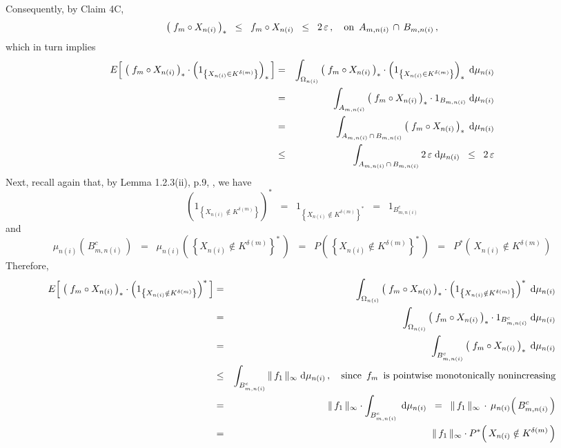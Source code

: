 Consequently, by Claim 4C,
\begin{equation*}
\left(\;f_{m} \circ X_{n(i)}\,\right)_{*}
\;\; \leq \;\;
	f_{m} \circ X_{n(i)}
\;\; \leq \;\;
	2\,\varepsilon\,,
\quad
\textnormal{on \,$A_{m,n(i)} \,\cap\, B_{m,n(i)}$}\,,
\end{equation*}
which in turn implies
\begin{eqnarray*}
E\!\left[\;
	\left(\;f_{m} \circ X_{n(i)}\,\right)_{*}
	\cdot
	\left(1_{\left\{X_{n(i)} \in K^{\delta(m)}\right\}}\right)_{*}
\,\right]
&=&
	\int_{\Omega_{n(i)}}
		\left(\;f_{m} \circ X_{n(i)}\,\right)_{*}
		\cdot
		\left(1_{\left\{X_{n(i)} \in K^{\delta(m)}\right\}}\right)_{*}
	\;\textnormal{d}\mu_{n(i)}
\\
&=&
	\int_{A_{m,n(i)}}
		\left(\;f_{m} \circ X_{n(i)}\,\right)_{*}
		\cdot
		1_{B_{m,n(i)}}
	\;\textnormal{d}\mu_{n(i)}
\\
&=&
	\int_{A_{m,n(i)} \,\cap\, B_{m,n(i)}}
		\left(\;f_{m} \circ X_{n(i)}\,\right)_{*}
	\;\textnormal{d}\mu_{n(i)}
\\
&\leq&
	\int_{A_{m,n(i)} \,\cap\, B_{m,n(i)}} 2\,\varepsilon \;\textnormal{d}\mu_{n(i)}
\;\; \leq \;\;
	2\,\varepsilon
\end{eqnarray*}
Next, recall again that, by Lemma 1.2.3(ii), p.9, \cite{vanDerVaart1996}, we have
\begin{equation*}
\left(1_{\left\{X_{n(i)} \notin K^{\delta(m)}\right\}}\right)^{*}
\;\; = \;\;
	1_{\left\{X_{n(i)} \notin K^{\delta(m)}\right\}^{*}}
\;\; = \;\;
	1_{B_{m,n(i)}^{c}}
\end{equation*}
and
\begin{equation*}
\mu_{n(i)}\!\left(\,B_{m,n(i)}^{c}\,\right)
\;\; = \;\;
	\mu_{n(i)}\!\left(\,\left\{X_{n(i)} \notin K^{\delta(m)}\right\}^{*}\,\right)
\;\; = \;\;
	P\!\left(\,\left\{X_{n(i)} \notin K^{\delta(m)}\right\}^{*}\,\right)
\;\; = \;\;
	P^{*}\!\left(\,X_{n(i)} \notin K^{\delta(m)}\,\right)
\end{equation*}
Therefore,
\begin{eqnarray*}
E\!\left[\;
	\left(\;f_{m} \circ X_{n(i)}\,\right)_{*}
	\cdot
	\left(1_{\left\{X_{n(i)} \notin K^{\delta(m)}\right\}}\right)^{*}
\,\right]
&=&
	\int_{\Omega_{n(i)}}
		\left(\;f_{m} \circ X_{n(i)}\,\right)_{*}
		\cdot
		\left(1_{\left\{X_{n(i)} \notin K^{\delta(m)}\right\}}\right)^{*}
	\;\textnormal{d}\mu_{n(i)}
\\
&=&
	\int_{\Omega_{n(i)}}
		\left(\;f_{m} \circ X_{n(i)}\,\right)_{*}
		\cdot
		1_{B_{m,n(i)}^{c}}
	\;\textnormal{d}\mu_{n(i)}
\\
&=&
	\int_{B_{m,n(i)}^{c}}
		\left(\;f_{m} \circ X_{n(i)}\,\right)_{*}
	\;\textnormal{d}\mu_{n(i)}
\\
&\leq&
	\int_{B_{m,n(i)}^{c}} \Vert\,f_{1}\,\Vert_{\infty} \;\textnormal{d}\mu_{n(i)}\,,
	\quad
	\textnormal{since \,$f_{m}$\, is pointwise monotonically nonincreasing}
\\
&=&
	\Vert\,f_{1}\,\Vert_{\infty} \cdot \int_{B_{m,n(i)}^{c}} \;\textnormal{d}\mu_{n(i)}
\;\; = \;\;
	\Vert\,f_{1}\,\Vert_{\infty} \,\cdot\, \mu_{n(i)}\!\left(\,B_{m,n(i)}^{c}\,\right)
\\
&=&
	\Vert\,f_{1}\,\Vert_{\infty} \cdot P^{*}\!\left(\,X_{n(i)} \notin K^{\delta(m)}\,\right)
\end{eqnarray*}
